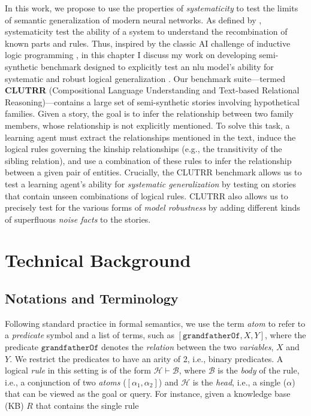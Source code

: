 \documentclass[letterpaper, 12pt]{report}
\begin{document}
In this work, we propose to use the properties of \textit{systematicity} to test the limits of semantic generalization of modern neural networks. As defined by \citet{fodor1988connectionism}, systematicity test the ability of a system to understand the recombination of known parts and rules. Thus, inspired by the classic AI challenge of inductive logic programming \citep{Quinlan1990-iv}, in this chapter I discuss my work on developing semi-synthetic benchmark designed to explicitly test an \acrshort{nlu} model's ability for systematic and robust logical generalization \citep{sinha-etal-2019-clutrr}.
Our benchmark suite---termed \textbf{CLUTRR} (Compositional Language Understanding and Text-based Relational Reasoning)---contains a large set of semi-synthetic stories involving hypothetical families.
Given a story, the goal is to infer the relationship between two family members, whose relationship is not explicitly mentioned.
To solve this task, a learning agent must extract the relationships mentioned in the text, induce the logical rules governing the kinship relationships (e.g., the transitivity of the sibling relation), and use a combination of these rules to infer the relationship between a given pair of entities.
Crucially, the CLUTRR benchmark allows us to test a learning agent's ability for \emph{systematic generalization} by testing on stories that contain unseen combinations of logical rules.
CLUTRR also allows us to precisely test for the various forms of \emph{model robustness} by adding different kinds of superfluous \emph{noise facts} to the stories.


\section{Technical Background}
\label{sec:clutrr_bg}

\subsection{Notations and Terminology}

Following standard practice in formal semantics, we use the term \textit{atom} to refer to a \textit{predicate} symbol and a list of terms, such as $[\texttt{grandfatherOf},X,Y]$, where the predicate $\texttt{grandfatherOf}$ denotes the \textit{relation} between the two \textit{variables}, $X$ and $Y$. We restrict the predicates to have an arity of 2, i.e.,  binary predicates.
A logical \textit{rule} in this setting is of the form $\mathcal{H} \vdash \mathcal{B}$, where $\mathcal{B}$ is the \textit{body} of the rule, i.e., a conjunction of two \textit{atoms} ($[\alpha_1,\alpha_2]$) and $\mathcal{H}$ is the \textit{head}, i.e., a single  ($\alpha$) that can be viewed as the goal or query.
For instance, given a knowledge base (KB) $R$ that contains the single rule
\end{document}

